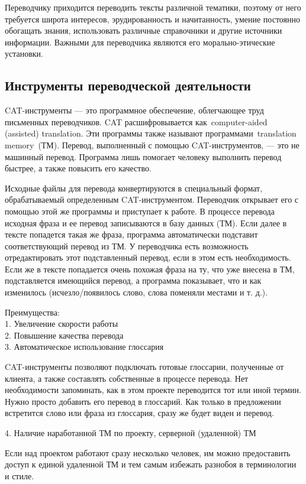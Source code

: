 Переводчику приходится переводить тексты различной тематики, поэтому от него требуется широта интересов, эрудированность и начитанность, умение постоянно обогащать знания, использовать различные справочники и другие источники информации. Важными для переводчика являются его морально-этические установки.

\subsection*{Инструменты переводческой деятельности}

CAT-инструменты --- это программное обеспечение, облегчающее труд письменных переводчиков. CAT расшифровывается как computer-aided (assisted) translation. Эти программы также называют программами translation memory (ТМ). Перевод, выполненный с помощью CAT-инструментов, --- это не машинный перевод. Программа лишь помогает человеку выполнить перевод быстрее, а также повысить его качество.

Исходные файлы для перевода конвертируются в специальный формат, обрабатываемый определенным CAT-инструментом. Переводчик открывает его с помощью этой же программы и приступает к работе. В процессе перевода исходная фраза и ее перевод записываются в базу данных (ТМ). Если далее в тексте попадется такая же фраза, программа автоматически подставит соответствующий перевод из ТМ. У переводчика есть возможность отредактировать этот подставленный перевод, если в этом есть необходимость. Если же в тексте попадается очень похожая фраза на ту, что уже внесена в ТМ, подставляется имеющийся перевод, а программа показывает, что и как изменилось (исчезло/появилось слово, слова поменяли местами и т. д.).

Преимущества:
\\
1. Увеличение скорости работы
\\
2. Повышение качества перевода
\\
3. Автоматическое использование глоссария

CAT-инструменты позволяют подключать готовые глоссарии, полученные от клиента, а также составлять собственные в процессе перевода. Нет необходимости запоминать, как в этом проекте переводится тот или иной термин. Нужно просто добавить его перевод в глоссарий. Как только в предложении встретится слово или фраза из глоссария, сразу же будет виден и перевод.

4. Наличие наработанной ТМ по проекту, серверной (удаленной) ТМ

Если над проектом работают сразу несколько человек, им можно предоставить доступ к единой удаленной ТМ и тем самым избежать разнобоя в терминологии и стиле.

